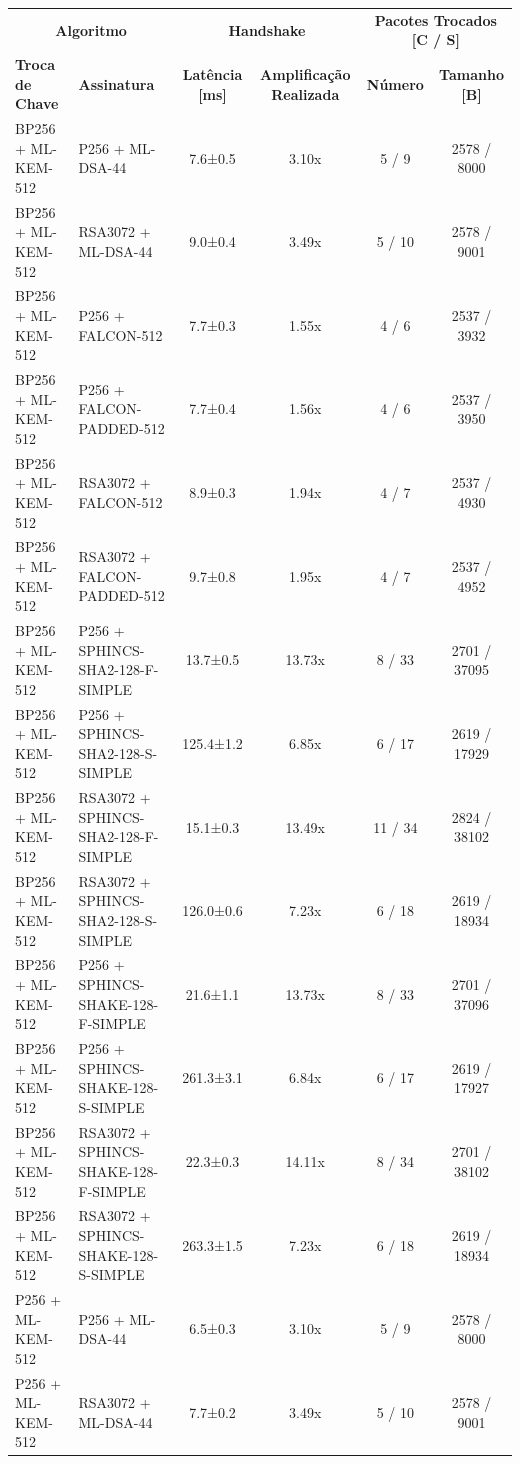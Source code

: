 \documentclass[10pt]{article}
\begin{document}
\centering
\small
\begin{tabular}{@{}l l c c c c@{}}
\toprule
\multicolumn{2}{c}{\textbf{Algoritmo}} & \multicolumn{2}{c}{\textbf{Handshake}} & \multicolumn{2}{c}{\textbf{Pacotes Trocados [C / S]}} \\
\cmidrule(lr){1-2}\cmidrule(lr){3-4}\cmidrule(lr){5-6}
\textbf{Troca de Chave} & \textbf{Assinatura} & \textbf{Latência [ms]} & \textbf{Amplificação Realizada} & \textbf{Número} & \textbf{Tamanho [B]} \\
\midrule
BP256 + ML-KEM-512 & P256 + ML-DSA-44 & 7.6±0.5 & 3.10x & 5 / 9 & 2578 / 8000 \\
BP256 + ML-KEM-512 & RSA3072 + ML-DSA-44 & 9.0±0.4 & 3.49x & 5 / 10 & 2578 / 9001 \\
BP256 + ML-KEM-512 & P256 + FALCON-512 & 7.7±0.3 & 1.55x & 4 / 6 & 2537 / 3932 \\
BP256 + ML-KEM-512 & P256 + FALCON-PADDED-512 & 7.7±0.4 & 1.56x & 4 / 6 & 2537 / 3950 \\
BP256 + ML-KEM-512 & RSA3072 + FALCON-512 & 8.9±0.3 & 1.94x & 4 / 7 & 2537 / 4930 \\
BP256 + ML-KEM-512 & RSA3072 + FALCON-PADDED-512 & 9.7±0.8 & 1.95x & 4 / 7 & 2537 / 4952 \\
BP256 + ML-KEM-512 & P256 + SPHINCS-SHA2-128-F-SIMPLE & 13.7±0.5 & 13.73x & 8 / 33 & 2701 / 37095 \\
BP256 + ML-KEM-512 & P256 + SPHINCS-SHA2-128-S-SIMPLE & 125.4±1.2 & 6.85x & 6 / 17 & 2619 / 17929 \\
BP256 + ML-KEM-512 & RSA3072 + SPHINCS-SHA2-128-F-SIMPLE & 15.1±0.3 & 13.49x & 11 / 34 & 2824 / 38102 \\
BP256 + ML-KEM-512 & RSA3072 + SPHINCS-SHA2-128-S-SIMPLE & 126.0±0.6 & 7.23x & 6 / 18 & 2619 / 18934 \\
BP256 + ML-KEM-512 & P256 + SPHINCS-SHAKE-128-F-SIMPLE & 21.6±1.1 & 13.73x & 8 / 33 & 2701 / 37096 \\
BP256 + ML-KEM-512 & P256 + SPHINCS-SHAKE-128-S-SIMPLE & 261.3±3.1 & 6.84x & 6 / 17 & 2619 / 17927 \\
BP256 + ML-KEM-512 & RSA3072 + SPHINCS-SHAKE-128-F-SIMPLE & 22.3±0.3 & 14.11x & 8 / 34 & 2701 / 38102 \\
BP256 + ML-KEM-512 & RSA3072 + SPHINCS-SHAKE-128-S-SIMPLE & 263.3±1.5 & 7.23x & 6 / 18 & 2619 / 18934 \\
P256 + ML-KEM-512 & P256 + ML-DSA-44 & 6.5±0.3 & 3.10x & 5 / 9 & 2578 / 8000 \\
P256 + ML-KEM-512 & RSA3072 + ML-DSA-44 & 7.7±0.2 & 3.49x & 5 / 10 & 2578 / 9001 \\

\end{tabular}
\end{document}
